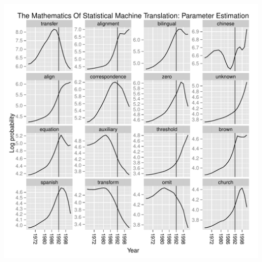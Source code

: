 \message{ !name(sgerrish_prefpo.tex)}\documentclass{beamer}
\begin{document}
{\begin{columns}
\begin{column}[left]{0.7\linewidth}
      \includegraphics[width=1.0\textwidth]{figs/acl_brown.pdf}
    \end{column}
  \end{columns}

}


\end{document}
